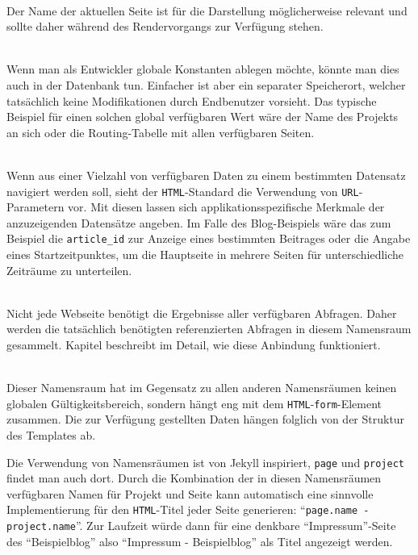 \begin{description}[noitemsep]
\item[\texttt{page} für Eigenschaften der Seite] \hfill \\
  Der Name der aktuellen Seite ist für die Darstellung möglicherweise relevant und sollte daher während des Rendervorgangs zur Verfügung stehen.
\item[\texttt{project} für Eigenschaften des Projektes] \hfill \\
  Wenn man als Entwickler globale Konstanten ablegen möchte, könnte man dies auch in der Datenbank tun. Einfacher ist aber ein separater Speicherort, welcher tatsächlich keine Modifikationen durch Endbenutzer vorsieht. Das typische Beispiel für einen solchen global verfügbaren Wert wäre der Name des Projekts an sich oder die Routing-Tabelle mit allen verfügbaren Seiten.
\item[\texttt{get} für \texttt{URL}-Parameter] \hfill \\
  Wenn aus einer Vielzahl von verfügbaren Daten zu einem bestimmten Datensatz navigiert werden soll, sieht der \texttt{HTML}-Standard die Verwendung von \texttt{URL}-Parametern vor. Mit diesen lassen sich applikationsspezifische Merkmale der anzuzeigenden Datensätze angeben. Im Falle des Blog-Beispiels wäre das zum Beispiel die \texttt{article\_id} zur Anzeige eines bestimmten Beitrages oder die Angabe eines Startzeitpunktes, um die Hauptseite in mehrere Seiten für unterschiedliche Zeiträume zu unterteilen.
\item[\texttt{query} für \texttt{SELECT}-Abfragen] \hfill \\
  Nicht jede Webseite benötigt die Ergebnisse aller verfügbaren Abfragen. Daher werden die tatsächlich benötigten referenzierten Abfragen in diesem Namensraum gesammelt. Kapitel  beschreibt im Detail, wie diese Anbindung funktioniert.
\item[\texttt{form} für Benutzereingaben] \hfill \\
  Dieser Namensraum hat im Gegensatz zu allen anderen Namensräumen keinen globalen Gültigkeitsbereich, sondern hängt eng mit dem \texttt{HTML}-\texttt{form}-Element zusammen. Die zur Verfügung gestellten Daten hängen folglich von der Struktur des Templates ab.
\end{description}

Die Verwendung von Namensräumen ist von Jekyll inspiriert, \texttt{page} und \texttt{project} findet man auch dort. Durch die Kombination der in diesen Namensräumen verfügbaren Namen für Projekt und Seite kann \idename{} automatisch eine sinnvolle Implementierung für den \texttt{HTML}-Titel jeder Seite generieren: "`\texttt{page.name - project.name}"'. Zur Laufzeit würde dann für eine denkbare "`Impressum"'-Seite des "`Beispielblog"' also "`Impressum - Beispielblog"' als Titel angezeigt werden.

